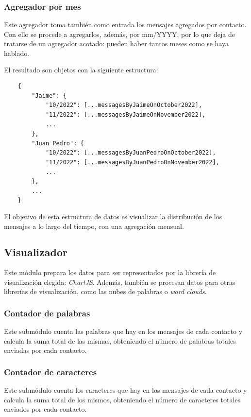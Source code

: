 \subsubsection{Agregador por mes}

Este agregador toma también como entrada los mensajes agregados por contacto. Con ello se procede a agregarlos, además, por mm/YYYY, por lo que deja de tratarse de un agregador acotado: pueden haber tantos meses como se haya hablado.

El resultado son objetos con la siguiente estructura:

\begin{lstlisting}
	{
		"Jaime": {
			"10/2022": [...messagesByJaimeOnOctober2022],
			"11/2022": [...messagesByJaimeOnNovember2022],
			...
		},
		"Juan Pedro": {
			"10/2022": [...messagesByJuanPedroOnOctober2022],
			"11/2022": [...messagesByJuanPedroOnNovember2022],
			...
		},
		...
	}
\end{lstlisting}

El objetivo de esta estructura de datos es visualizar la distribución de los mensajes a lo largo del tiempo, con una agregación mensual.

\subsection{Visualizador}

Este módulo prepara los datos para ser representados por la librería de visualización elegida: \textit{ChartJS}. Además, también se procesan datos para otras librerías de visualización, como las nubes de palabras o \textit{word clouds}.

\subsubsection{Contador de palabras}

Este submódulo cuenta las palabras que hay en los mensajes de cada contacto y calcula la suma total de las mismas, obteniendo el número de palabras totales enviadas por cada contacto.

\subsubsection{Contador de caracteres}

Este submódulo cuenta los caracteres que hay en los mensajes de cada contacto y calcula la suma total de los mismos, obteniendo el número de caracteres totales enviados por cada contacto.

